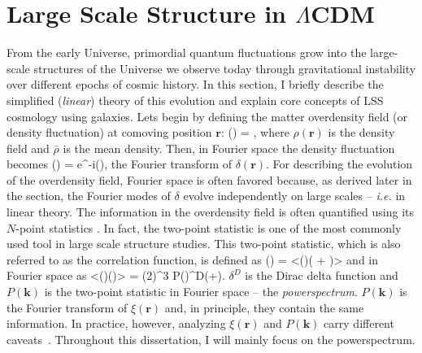 

\section{Large Scale Structure in $\Lambda$CDM} \label{sec:lss}
From the early Universe, primordial quantum fluctuations grow into the 
large-scale structures of the Universe we observe today through gravitational 
instability over different epochs of cosmic history. In this section, I briefly 
describe the simplified ({\em linear}) theory of this evolution and explain core 
concepts of LSS cosmology using galaxies. Lets begin by defining the matter 
overdensity field (or density fluctuation) at comoving position $\bm{r}$: 
\beq \label{eq:delta}
\delta() = , 
\eeq
where $\rho(\bm{r})$ is the density field and $\bar{\rho}$ is the mean 
density. Then, in Fourier space the density fluctuation becomes 
\beq
\delta() = \int {}\; e^{-i\cdot{}}\;\delta(),
\eeq
the Fourier transform of $\delta(\bm{r})$. 
For describing the evolution of the overdensity field, Fourier space is often 
favored because, as derived later in the section, the Fourier modes of 
$\delta$ evolve independently on large scales -- \emph{i.e.} in linear theory.
The information in the overdensity field is often quantified using its 
$N$-point statistics \citep{peebles80, Bernardeau:2002aa, DodelsonBook}. 
In fact, the two-point statistic is one of the most commonly used tool in 
large scale structure studies. This two-point statistic, which is also 
referred to as the correlation function, is defined as 
\beq
\xi() = <\delta()\delta( +  )>
\eeq
and in Fourier space as
\beq
<\delta()\delta()> = (2\pi)^3 P()\;\delta^{D}(+).
\eeq
$\delta^{D}$ is the Dirac delta function and $P(\bm{k})$ is the two-point statistic in 
Fourier space -- the {\em powerspectrum}. $P(\bm{k})$ is the Fourier transform of 
$\xi(\bm{r})$ and, in principle, they contain the same information. 
In practice, however, analyzing $\xi(\bm{r})$ and $P(\bm{k})$ carry different 
caveats~\citep{Feldman:1994aa}. Throughout this dissertation, I will mainly focus 
on the powerspectrum. 

